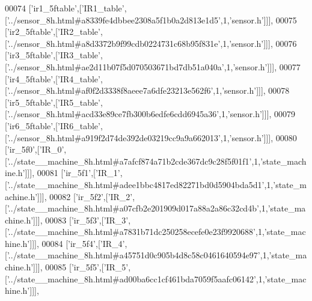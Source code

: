 \begin{DoxyCode}
00074   [\textcolor{stringliteral}{'ir1\_5ftable'},[\textcolor{stringliteral}{'IR1\_table'},[\textcolor{stringliteral}{'../sensor\_8h.html#a8339fe4dbbee2308a5f1b0a2d813e1d5'},1,\textcolor{stringliteral}{'sensor.h'}]]],
00075   [\textcolor{stringliteral}{'ir2\_5ftable'},[\textcolor{stringliteral}{'IR2\_table'},[\textcolor{stringliteral}{'../sensor\_8h.html#a8d3372b9f99cdb0224731c68b95f831e'},1,\textcolor{stringliteral}{'sensor.h'}]]],
00076   [\textcolor{stringliteral}{'ir3\_5ftable'},[\textcolor{stringliteral}{'IR3\_table'},[\textcolor{stringliteral}{'../sensor\_8h.html#ae2d11b07f5d070503671bd7db51a040a'},1,\textcolor{stringliteral}{'sensor.h'}]]],
00077   [\textcolor{stringliteral}{'ir4\_5ftable'},[\textcolor{stringliteral}{'IR4\_table'},[\textcolor{stringliteral}{'../sensor\_8h.html#af0f2d3338f8aeee7a6dfe23213e562f6'},1,\textcolor{stringliteral}{'sensor.h'}]]],
00078   [\textcolor{stringliteral}{'ir5\_5ftable'},[\textcolor{stringliteral}{'IR5\_table'},[\textcolor{stringliteral}{'../sensor\_8h.html#acd33e89ce7fb300b6edfe6cdd6945a36'},1,\textcolor{stringliteral}{'sensor.h'}]]],
00079   [\textcolor{stringliteral}{'ir6\_5ftable'},[\textcolor{stringliteral}{'IR6\_table'},[\textcolor{stringliteral}{'../sensor\_8h.html#a919f2d74de392de03219cc9a9a662013'},1,\textcolor{stringliteral}{'sensor.h'}]]],
00080   [\textcolor{stringliteral}{'ir\_5f0'},[\textcolor{stringliteral}{'IR\_0'},[\textcolor{stringliteral}{'../state\_\_machine\_8h.html#a7afcf874a71b2cde367dc9c28f5f01f1'},1,\textcolor{stringliteral}{'state\_machine.h'}]]],
00081   [\textcolor{stringliteral}{'ir\_5f1'},[\textcolor{stringliteral}{'IR\_1'},[\textcolor{stringliteral}{'../state\_\_machine\_8h.html#adee1bbc4817ed82271bd0d5904bda5d1'},1,\textcolor{stringliteral}{'state\_machine.h'}]]],
00082   [\textcolor{stringliteral}{'ir\_5f2'},[\textcolor{stringliteral}{'IR\_2'},[\textcolor{stringliteral}{'../state\_\_machine\_8h.html#a07cfb2e201909d017a88a2a86c32cd4b'},1,\textcolor{stringliteral}{'state\_machine.h'}]]],
00083   [\textcolor{stringliteral}{'ir\_5f3'},[\textcolor{stringliteral}{'IR\_3'},[\textcolor{stringliteral}{'../state\_\_machine\_8h.html#a7831b71dc250258ecefe0e23f9920688'},1,\textcolor{stringliteral}{'state\_machine.h'}]]],
00084   [\textcolor{stringliteral}{'ir\_5f4'},[\textcolor{stringliteral}{'IR\_4'},[\textcolor{stringliteral}{'../state\_\_machine\_8h.html#a45751d0c905b4d8c58c0461640594e97'},1,\textcolor{stringliteral}{'state\_machine.h'}]]],
00085   [\textcolor{stringliteral}{'ir\_5f5'},[\textcolor{stringliteral}{'IR\_5'},[\textcolor{stringliteral}{'../state\_\_machine\_8h.html#ad00ba6cc1cf461bda7059f5aafc06142'},1,\textcolor{stringliteral}{'state\_machine.h'}]]],

\end{DoxyCode}
